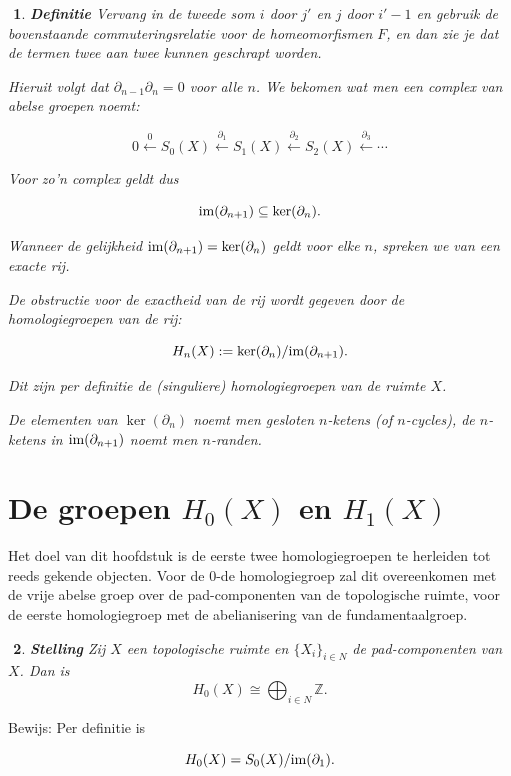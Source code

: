 \documentclass[12pt]{book}
\newcommand{\Z}{\mathbb{Z}}
\newcommand{\bew}{{\sc Bewijs: }}
\newtheorem{stelh}{$\!\!$}[section]
\newenvironment{stel}{\begin{stelh}{\em {\bf Stelling }}}{\end{stelh}}
\newtheorem{dfh}[stelh]{$\!\!$}
\newenvironment{df}{\begin{dfh} \em {\bf Definitie }}{\end{dfh}}
\begin{document}
\begin{df}
Vervang in de tweede som $i$ door $j'$ en $j$ door $i'-1$ en gebruik de bovenstaande commuteringsrelatie voor de homeomorfismen $F$, en dan zie je dat de termen twee aan twee kunnen geschrapt worden.


Hieruit volgt dat $\partial_{n-1}\partial_{n}=0$ voor alle $n$. We bekomen wat men een {\em complex} van abelse groepen noemt:

$$0\stackrel{0}{\leftarrow} S_{0}(X) \stackrel{\partial_{1}}{\leftarrow} S_{1}(X)
\stackrel{\partial_{2}}{\leftarrow} S_{2}(X) \stackrel{\partial_{3}}{\leftarrow} \cdots $$

Voor zo'n complex geldt dus

$$\mbox{{\rm im}}(\partial_{n+1})\subseteq \ker (\partial_{n}).$$

Wanneer de gelijkheid $\mbox{{\rm im}}(\partial_{n+1})= \ker (\partial_{n})$ geldt voor elke $n$, spreken we van een  {\em exacte rij}.

De obstructie voor de exactheid van de rij wordt gegeven door de {\em homologiegroepen} van de rij:

$$H_{n}(X):=\ker (\partial_{n})/\mbox{{\rm im}}(\partial_{n+1}).\index{$H_n(X)$}$$

Dit zijn per definitie de (singuliere) homologiegroepen van de ruimte $X$.

De elementen van $\ker (\partial_n)$ noemt men {\em gesloten $n$-ketens} (of $n$-{\em cycles}), de $n$-ketens in $\mbox{{\rm im}} (\partial_{n+1})$ noemt men {\em $n$-randen}.
\end{df}

\section{De groepen $H_{0}(X)$ en $H_{1}(X)$}
Het doel van dit hoofdstuk is de eerste twee homologiegroepen te herleiden tot reeds gekende objecten. Voor de 0-de homologiegroep zal dit overeenkomen met de vrije abelse groep over de pad-componenten van de topologische ruimte, voor de eerste homologiegroep met de abelianisering van de fundamentaalgroep.
\begin{stel}
Zij $X$ een topologische ruimte en $\{X_{i}\}_{i\in N}$ de pad-componenten van $X$. Dan is
$$
H_0(X) \cong \bigoplus_{i \in N} \Z.
$$
\end{stel}
\bew
Per definitie is 

$$H_{0}(X)=S_{0}(X)/\mbox{{\rm im}}(\partial_{1}).$$ 
\end{document}
